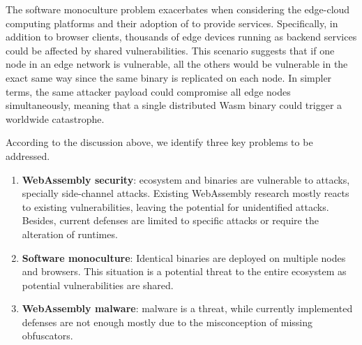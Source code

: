 The software monoculture problem exacerbates when considering the edge-cloud computing platforms and their adoption of \Wasm to provide services.
Specifically, in addition to browser clients, thousands of edge devices running \Wasm as backend services could be affected by shared vulnerabilities. 
This scenario suggests that if one node in an edge network is vulnerable, all the others would be vulnerable in the exact same way since the same binary is replicated on each node. 
In simpler terms, the same attacker payload could compromise all edge nodes simultaneously, meaning that a single distributed Wasm binary could trigger a worldwide catastrophe.




According to the discussion above, we identify three key problems to be addressed.

\begin{enumerate}[label=\textbf{P\arabic*}, ref=C\arabic*]

	\item \label{prob4} \textbf{WebAssembly security}: \Wasm ecosystem and binaries are vulnerable to attacks, specially side-channel attacks. Existing WebAssembly research mostly reacts to existing vulnerabilities, leaving the potential for unidentified attacks.
	Besides, current defenses are limited to specific attacks or require the alteration of runtimes. 
	
	\item \label{prob2} \textbf{Software monoculture}: Identical \Wasm binaries are deployed on multiple nodes and browsers. This situation is a potential threat to the entire ecosystem as potential vulnerabilities are shared.
	 
	\item \label{prob5} \textbf{WebAssembly malware}: \Wasm malware is a threat, while currently implemented defenses are not enough mostly due to the misconception of missing obfuscators.

\end{enumerate}


\begin{comment}
\msection{Problem statement}

\end{comment}


